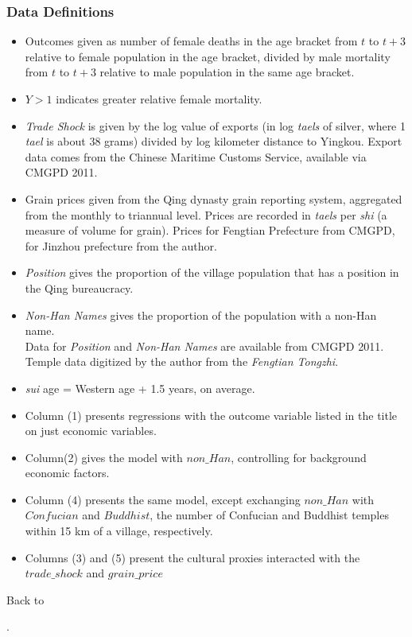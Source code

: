 \begin{frame}[label = datadefs]
\frametitle{Data Definitions}
{\tiny
\begin{itemize}
\item Outcomes given as number of female deaths in the age bracket from $t$ to $t+3$ relative to female population in the age bracket, divided by male mortality from $t$ to $t+3$ relative to male population in the same age bracket. 
\item $Y>1$ indicates greater relative female mortality.\\
\item \emph{Trade Shock} is given by the log value of exports (in log \emph{taels} of silver, where 1 \emph{tael} is about 38 grams) divided by log kilometer distance to Yingkou. Export data comes from the Chinese Maritime Customs Service, available via CMGPD 2011.\\
\item Grain prices given from the Qing dynasty grain reporting system, aggregated from the monthly to triannual level. Prices are recorded in \emph{taels} per \emph{shi} (a measure of volume for grain). Prices for Fengtian Prefecture from CMGPD, for Jinzhou prefecture from the author.
\item \emph{Position} gives the proportion of the village population that has a position in the Qing bureaucracy.\\
\item \emph{Non-Han Names} gives the proportion of the population with a non-Han name.\\
Data for \emph{Position} and \emph{Non-Han Names} are available from CMGPD 2011.\\
Temple data digitized by the author from the \emph{Fengtian Tongzhi}.\\
\item \emph{sui} age = Western age + 1.5 years, on average. \\
\item Column (1) presents regressions with the outcome variable listed in the title on just economic variables. 
\item Column(2) gives the model with $non\_Han$, controlling for background economic factors. \item Column (4) presents the same model, except exchanging $non\_Han$ with $Confucian$ and $Buddhist$, the number of Confucian and Buddhist temples within 15 km of a village, respectively. \item Columns (3) and (5) present the cultural proxies interacted with the $trade\_shock$ and $grain\_price$\\
\end{itemize}
Back to \hyperlink{results}{}}.
\end{frame}

